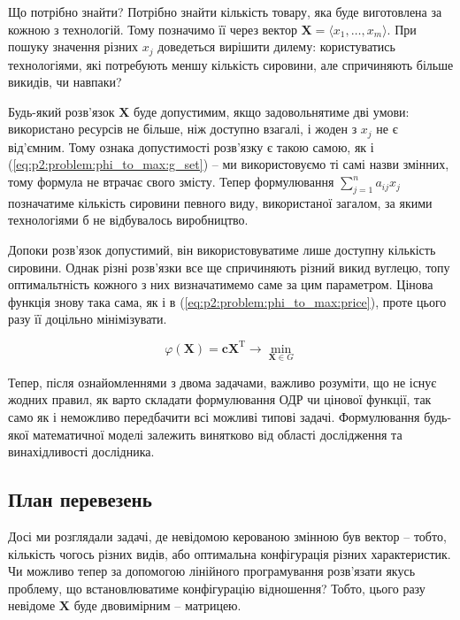 \documentclass[\main/book.tex]{subfiles}
\begin{document}
Що потрібно знайти? Потрібно знайти кількість товару, яка буде виготовлена за кожною з технологій. Тому позначимо її через вектор $\mathbf{X} = \langle x_1, \ldots, x_m \rangle$. При пошуку значення різних $x_j$ доведеться вирішити дилему: користуватись технологіями, які потребують меншу кількість сировини, але спричиняють більше викидів, чи навпаки?

Будь-який розв'язок $\mathbf{X}$ буде допустимим, якщо задовольнятиме дві умови: використано ресурсів не більше, ніж доступно взагалі, і жоден з $x_j$ не є від'ємним. Тому ознака допустимості розв'язку є такою самою, як і (\ref{eq:p2:problem:phi_to_max:g_set}) -- ми використовуємо ті самі назви змінних, тому формула не втрачає свого змісту. Тепер формулювання ${\sum_{j=1}^n a_{ij} x_j}$ позначатиме кількість сировини певного виду, використаної загалом, за якими технологіями б не відбувалось виробництво.

Допоки розв'язок допустимий, він використовуватиме лише дос\-туп\-ну кількість сировини. Однак різні розв'язки все ще спричиняють різний викид вуглецю, топу оптимальтність кожного з них визначатимемо саме за цим параметром. Цінова функція знову така сама, як і в (\ref{eq:p2:problem:phi_to_max:price}), проте цього разу її доцільно мінімізувати.

\begin{equation}
 \varphi(\mathbf{X}) =
 \mathbf{c} \mathbf{X}^\mathrm{T}
 \rightarrow \min_{\mathbf{X} \in G}
\end{equation}

\begin{note}
Тепер, після ознайомленнями з двома задачами, важливо розуміти, що не існує жодних правил, як варто складати формулювання ОДР чи цінової функції, так само як і неможливо передбачити всі можливі \flqq{}типові задачі\frqq{}. Формулювання будь-якої математичної моделі залежить винятково від області дослідження та винахідливості дослідника.
\end{note}

\subsection{План перевезень}

Досі ми розглядали задачі, де невідомою керованою змінною був вектор -- тобто, кількість чогось різних видів, або оптимальна конфігурація різних характеристик. Чи можливо тепер за допомогою лінійного програмування розв'язати якусь проблему, що встановлюватиме конфігурацію відношення? Тобто, цього разу невідоме $\mathbf{X}$ буде двовимірним -- матрицею.
\end{document}
